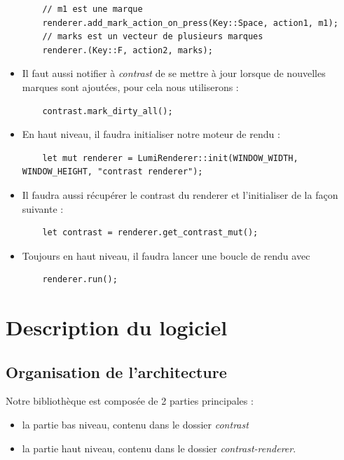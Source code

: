 \documentclass[12pt]{article}
\begin{document}
\begin{itemize}
\begin{verbatim}
    // m1 est une marque
    renderer.add_mark_action_on_press(Key::Space, action1, m1);
    // marks est un vecteur de plusieurs marques
    renderer.(Key::F, action2, marks);
    \end{verbatim}
    \item Il faut aussi notifier à \textit{contrast} de se mettre à jour lorsque de nouvelles marques sont ajoutées, pour cela nous utiliserons :
    \begin{verbatim}
    contrast.mark_dirty_all();
    \end{verbatim}
    \item En haut niveau, il faudra initialiser notre moteur de rendu :
    \begin{verbatim}
    let mut renderer = LumiRenderer::init(WINDOW_WIDTH, WINDOW_HEIGHT, "contrast renderer");
    \end{verbatim}
    \item Il faudra aussi récupérer le contrast du renderer et l'initialiser de la façon suivante :
    \begin{verbatim}
    let contrast = renderer.get_contrast_mut();
    \end{verbatim}
    \item Toujours en haut niveau, il faudra lancer une boucle de rendu avec
    \begin{verbatim}
    renderer.run();
    \end{verbatim}

\end{itemize}

\section{Description du logiciel}

\subsection{Organisation de l'architecture}

Notre bibliothèque est composée de 2 parties principales :
\begin{itemize}
\item la partie bas niveau, contenu dans le dossier \textit{contrast}
\item la partie haut niveau, contenu dans le dossier  \textit{contrast-renderer}.
\end{itemize}
\end{document}
